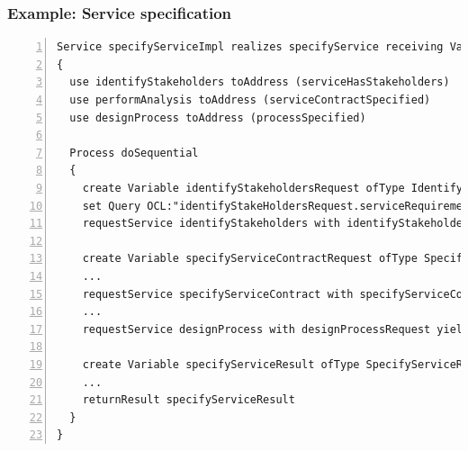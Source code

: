 
\begin{frame}[fragile]
\frametitle{Example: Service specification}

\lstset{language=urdad,label=serviceTextSyntax}
\begin{lstlisting}[numbers=left,escapechar=|]
Service specifyServiceImpl realizes specifyService receiving Variable specifyServiceRequest ofType SpecifyServiceRequest
{
  use identifyStakeholders toAddress (serviceHasStakeholders)
  use performAnalysis toAddress (serviceContractSpecified)
  use designProcess toAddress (processSpecified)

  Process doSequential
  {
    create Variable identifyStakeholdersRequest ofType IdentifyStakeholdersRequest
    set Query OCL:"identifyStakeHoldersRequest.serviceRequirements" equalTo Query OCL:"specifyServiceRequest.serviceRequirements"
    requestService identifyStakeholders with identifyStakeholdersRequest yielding Variable identifyStakeholdersResult ofType IdentifyStakeholdersResult	on NoStakeholdersException raiseException NoStakeholdersException

    create Variable specifyServiceContractRequest ofType SpecifyServiceContractRequest
    ...
    requestService specifyServiceContract with specifyServiceContractRequest yielding Variable specifyServiceContractResult ofType SpecifyServiceContractResult on InconsistentStakeholderRequirementsException raiseException InconsistentStakeholderRequirementsException
    ...
    requestService designProcess with designProcessRequest yielding Variable designProcessResult ofType DesignProcessResult

    create Variable specifyServiceResult ofType SpecifyServiceResult
    ...
    returnResult specifyServiceResult
  }
}
\end{lstlisting}
\end{frame}


